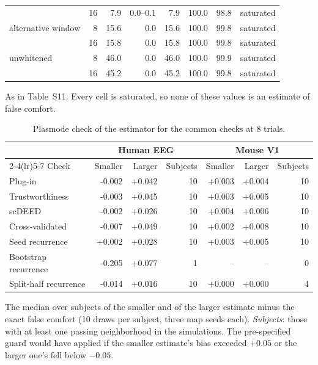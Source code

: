\documentclass[11pt]{article}
\newcommand{\tablenote}[1]{\par\smallskip\noindent
  \begin{minipage}{\linewidth}\footnotesize\setlength{\parindent}{0pt}#1\end{minipage}}
\begin{document}
\begin{table}[!htb]
\begin{tabular}{lrrrrrrl}
 & 16 & 7.9 & 0.0--0.1 & 7.9 & 100.0 & 98.8 & saturated \\
\addlinespace
alternative window & 8 & 15.6 & 0.0 & 15.6 & 100.0 & 99.8 & saturated \\
 & 16 & 15.8 & 0.0 & 15.8 & 100.0 & 99.8 & saturated \\
\addlinespace
unwhitened & 8 & 46.0 & 0.0 & 46.0 & 100.0 & 99.9 & saturated \\
 & 16 & 45.2 & 0.0 & 45.2 & 100.0 & 99.8 & saturated \\
\bottomrule
\end{tabular}
\tablenote{As in Table~S11.
Every cell is saturated, so none of these values is an estimate of false comfort.}
\end{table}

\begin{table}[!htb]
\centering\small
\caption{Plasmode check of the estimator for the common checks at 8 trials.}
\begin{tabular}{lrrrrrr}
\toprule
 & \multicolumn{3}{c}{Human EEG} & \multicolumn{3}{c}{Mouse V1} \\
\cmidrule(lr){2-4}\cmidrule(lr){5-7}
Check & Smaller & Larger & Subjects & Smaller & Larger & Subjects \\
\midrule
Plug-in & -0.002 & +0.042 & 10 & +0.003 & +0.004 & 10 \\
Trustworthiness & -0.003 & +0.045 & 10 & +0.003 & +0.005 & 10 \\
scDEED & -0.002 & +0.026 & 10 & +0.004 & +0.006 & 10 \\
Cross-validated & -0.007 & +0.049 & 10 & +0.002 & +0.008 & 10 \\
Seed recurrence & +0.002 & +0.028 & 10 & +0.003 & +0.005 & 10 \\
Bootstrap recurrence & -0.205 & +0.077 & 1 & -- & -- & 0 \\
Split-half recurrence & -0.014 & +0.016 & 10 & +0.000 & +0.000 & 4 \\
\bottomrule
\end{tabular}
\tablenote{The median over subjects of the smaller and of the larger estimate minus the exact false comfort (10 draws per subject, three map seeds each).
\emph{Subjects}: those with at least one passing neighborhood in the simulations.
The pre-specified guard would have applied if the smaller estimate's bias exceeded $+0.05$ or the larger one's fell below $-0.05$.}
\end{table}
\end{document}
